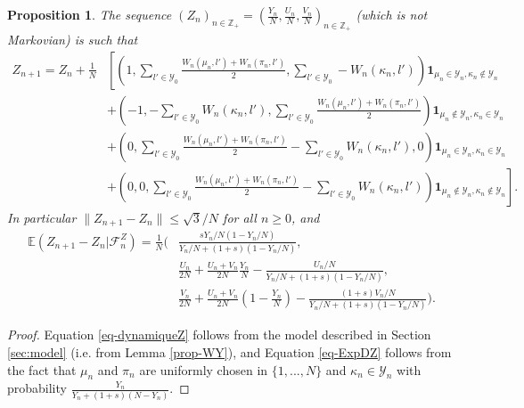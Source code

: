 \documentclass[11pt]{article}
\newtheorem{proposition}[theorem]{Proposition}
\theoremstyle{remark}
\numberwithin{equation}{section}
\begin{document}
\begin{proposition}\label{prop-Z} The sequence $(Z_n)_{n\in\mathbb{Z}_+}=\left(\frac{Y_n}{N},\frac{U_n}{N},\frac{V_n}{N}\right)_{n\in\mathbb{Z}_+}$ (which is not Markovian) is such that
\begin{equation}\label{eq-dynamiqueZ}\begin{aligned}
Z_{n+1}=Z_n+\frac{1}{N}&\left[\left(1,\sum_{l'\in\mathcal{Y}_0}\frac{W_n(\mu_n,l')+W_n(\pi_n,l')}{2},\sum_{l'\in\mathcal{Y}_0}-W_n(\kappa_n,l')\right)\mathbf{1}_{\mu_n\in\mathcal{Y}_n,\kappa_n\notin\mathcal{Y}_n}\right.\\&+\left(-1,-\sum_{l'\in\mathcal{Y}_0}W_n(\kappa_n,l'),\sum_{l'\in\mathcal{Y}_0}\frac{W_n(\mu_n,l')+W_n(\pi_n,l')}{2}\right)\mathbf{1}_{\mu_n\notin\mathcal{Y}_n,\kappa_n\in\mathcal{Y}_n}\\&+\left(0,\sum_{l'\in\mathcal{Y}_0}\frac{W_n(\mu_n,l')+W_n(\pi_n,l')}{2}-\sum_{l'\in\mathcal{Y}_0}W_n(\kappa_n,l'),0\right)\mathbf{1}_{\mu_n\in\mathcal{Y}_n,\kappa_n\in\mathcal{Y}_n}\\&+\left.\left(0,0,\sum_{l'\in\mathcal{Y}_0}\frac{W_n(\mu_n,l')+W_n(\pi_n,l')}{2}-\sum_{l'\in\mathcal{Y}_0}W_n(\kappa_n,l')\right)\mathbf{1}_{\mu_n\notin\mathcal{Y}_n,\kappa_n\notin\mathcal{Y}_n}\right].\end{aligned}
\end{equation}
In particular $\|Z_{n+1}-Z_n\|\leq \sqrt{3}/N$ for all $n\geq0$, and 
\begin{equation}\label{eq-ExpDZ}\begin{aligned}\mathbb{E}\left(Z_{n+1}-Z_n|\mathcal{F}^Z_n\right)=\frac{1}{N}\Big(&\frac{sY_n/N(1-Y_n/N)}{Y_n/N+(1+s)(1-Y_n/N)},\\&\frac{U_n}{2N}+\frac{U_n+V_n}{2N}\frac{Y_n}{N}-\frac{U_n/N}{Y_n/N+(1+s)(1-Y_n/N)},\\&\frac{V_n}{2N}+\frac{U_n+V_n}{2N}\left(1-\frac{Y_n}{N}\right)-\frac{(1+s)V_n/N}{Y_n/N+(1+s)(1-Y_n/N)}\Big).\end{aligned}\end{equation}
\end{proposition}

\begin{proof} 
Equation \eqref{eq-dynamiqueZ} follows from the model described in Section \ref{sec:model} (i.e. from Lemma \ref{prop-WY}), and Equation \eqref{eq-ExpDZ} follows from the fact that $\mu_n$ and $\pi_n$ are uniformly chosen in $\{1,...,N\}$ and $\kappa_n\in\mathcal{Y}_n$ with probability $\frac{Y_n}{Y_n+(1+s)(N-Y_n)}$.
\end{proof}
\end{document}
